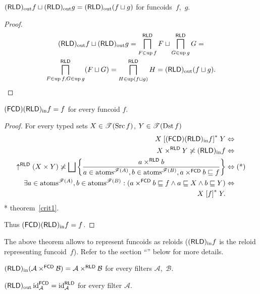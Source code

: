 \begin{prop}
$(\mathsf{RLD})_{\mathrm{out}} f \sqcup (\mathsf{RLD})_{\mathrm{out}} g = (\mathsf{RLD})_{\mathrm{out}}(f \sqcup g)$
for funcoids~$f$,~$g$.
\end{prop}

\begin{proof}
\begin{multline*}
(\mathsf{RLD})_{\mathrm{out}} f \sqcup (\mathsf{RLD})_{\mathrm{out}} g = \bigsqcap^{\mathsf{RLD}}_{F \in \operatorname{up} f} F \sqcup
\bigsqcap^{\mathsf{RLD}}_{G \in \operatorname{up} g} G =\\ \bigsqcap^{\mathsf{RLD}}_{F \in
\operatorname{up} f, G \in \operatorname{up} g} (F \sqcup G) = \bigsqcap^{\mathsf{RLD}}_{H \in
\operatorname{up} (f \sqcup g)} H = (\mathsf{RLD})_{\mathrm{out}} (f \sqcup g).
\end{multline*}
\end{proof}

\begin{thm}
$(\mathsf{FCD})(\mathsf{RLD})_{\mathrm{in}} f=f$ for every funcoid $f$.\end{thm}
\begin{proof}
For every typed sets $X\in\mathscr{T}(\operatorname{Src} f)$, $Y\in\mathscr{T}(\operatorname{Dst} f)$
\begin{align*}
X\rsuprel{\tofcd\torldin f}Y & \Leftrightarrow\\
X\times^{\mathsf{RLD}}Y\nasymp\torldin f & \Leftrightarrow\\
\uparrow^{\mathsf{RLD}}(X\times Y)\nasymp\bigsqcup\setcond{a\times^{\mathsf{RLD}}b}{a\in\atoms^{\mathscr{F}(A)},b\in\atoms^{\mathscr{F}(B)},a\times^{\mathsf{FCD}}b\sqsubseteq f} & \Leftrightarrow\text{(*)}\\
\exists a\in\atoms^{\mathscr{F}(A)},b\in\atoms^{\mathscr{F}(B)}:(a\times^{\mathsf{FCD}}b\sqsubseteq f\land a\sqsubseteq X\land b\sqsubseteq Y) & \Leftrightarrow\\
X\rsuprel fY.
\end{align*}
{*} theorem~\ref{crit1}.

Thus $(\mathsf{FCD})(\mathsf{RLD})_{\mathrm{in}} f=f$.\end{proof}
\begin{rem}
The above theorem allows to represent funcoids as reloids ($(\mathsf{RLD})_{\mathrm{in}} f$ is the reloid representing funcoid~$f$). Refer to
the section ``'' below for more details.\end{rem}
\begin{obvious}
$(\mathsf{RLD})_{\mathrm{in}}(\mathcal{A}\times^{\mathsf{FCD}}\mathcal{B})=\mathcal{A}\times^{\mathsf{RLD}}\mathcal{B}$
for every filters $\mathcal{A}$,~$\mathcal{B}$.\end{obvious}
\begin{conjecture}
$(\mathsf{RLD})_{\mathrm{out}}\operatorname{id}_{\mathcal{A}}^{\mathsf{FCD}}=\operatorname{id}_{\mathcal{A}}^{\mathsf{RLD}}$
for every filter $\mathcal{A}$.\end{conjecture}
